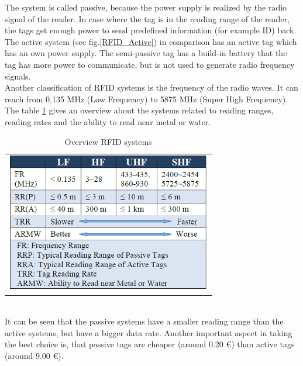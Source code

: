 The system is called passive, because the power supply is realized by the radio signal of the reader. In case where the tag is in the reading range of the reader, the tags get enough power to send predefined information (for example ID) back. The active system (see fig.\ref{RFID_Active}) in comparison has an active tag which has an own power supply. The semi-passive tag has a build-in battery that the tag has more power to communicate, but is not used to generate radio frequency signals.\\ 
Another classification of RFID systems is the frequency of the radio waves. It can reach from 0.135 MHz (Low Frequency) to 5875 MHz (Super High Frequency). The table \ref{RFID_Systems} gives an overview about the systems related to reading ranges, reading rates and the ability to read near metal or water.\\
\begin{table}[!htbp]
\centering
\begin{tabular}{c}
\includegraphics[width = 9cm]{Pictures/RFID_Systems}
\end{tabular}
\caption[Overview RFID systems]{Overview RFID systems \footnotemark[3]}
\label{RFID_Systems}
\end{table}\\
It can be seen that the passive systems have a smaller reading range than the active systems, but have a bigger data rate. Another important aspect in taking the best choice is, that passive tags are cheaper (around 0.20 \euro{}) than active tags (around 9.00 \euro{}).
